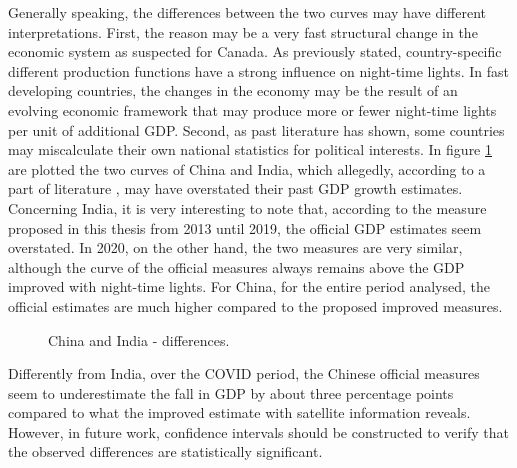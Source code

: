 Generally speaking, the differences between the two curves may have different interpretations.
First, the reason may be a very fast structural change in the economic system as suspected for Canada. As previously stated, country-specific different production functions have a strong influence on night-time lights. In fast developing countries, the changes in the economy may be the result of an evolving economic framework that may produce more or fewer night-time lights per unit of additional GDP. 
Second, as past literature has shown, some countries may miscalculate their own national statistics for political interests.
In figure \ref{fig:chinainda} are plotted the two curves of China and India, which allegedly, according to a part of literature \citep{martinez2018much}, may have overstated their past GDP growth estimates.
Concerning India, it is very interesting to note that, according to the measure proposed in this thesis from 2013 until 2019, the official GDP estimates seem overstated. In 2020, on the other hand, the two measures are very similar, although the curve of the official measures always remains above the GDP improved with night-time lights.
For China, for the entire period analysed, the official estimates are much higher compared to the proposed improved measures.
\begin{figure}[h!]
    \centering
    \hspace*{-2.8cm}
    \caption{China and India - differences.}%
    \label{fig:chinainda}
\end{figure}
Differently from India, over the COVID period, the Chinese official measures seem to underestimate the fall in GDP by about three percentage points compared to what the improved estimate with satellite information reveals.
However, in future work, confidence intervals should be constructed to verify that the observed differences are statistically significant.

